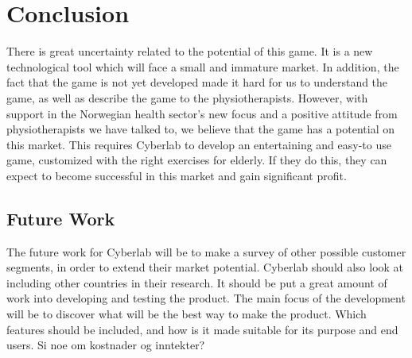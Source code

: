 \chapter{Conclusion}
There is great uncertainty related to the potential of this game. It is a new technological tool which will face a small and immature market. In addition, the fact that the game is not yet developed made it hard for us to understand the game, as well as describe the game to the physiotherapists. However, with support in the Norwegian health sector's new focus and a positive attitude from physiotherapists we have talked to, we believe that the game has a potential on this market. This requires Cyberlab to develop an entertaining and easy-to use game, customized with the right exercises for elderly. If they do this, they can expect to become successful in this market and gain significant profit.  
\section{Future Work}
The future work for Cyberlab will be to make a survey of other possible customer segments, in order to extend their market potential. Cyberlab should also look at including other countries in their research.
It should be put a great amount of work into developing and testing the product. The main focus of the development will be to discover what will be the best way to make the product. Which features should be included, and how is it made suitable for its purpose and end users.
Si noe om kostnader og inntekter? 